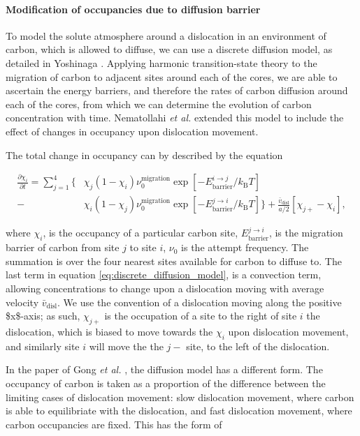 \documentclass[a4paper,11pt]{article}
\numberwithin{equation}{chapter}
\numberwithin{listing}{chapter}
\begin{document}
\paragraph{Modification of occupancies due to diffusion barrier}
\label{sec:org74cd325}


To model the solute atmosphere around a dislocation in an environment of
carbon, which is allowed to diffuse, we can use a discrete diffusion model,
as detailed in Yoshinaga \cite{Yoshinaga1971}. Applying harmonic
transition-state theory to the migration of carbon to adjacent sites around each of the cores,
we are able to ascertain the energy barriers, and therefore the rates of
carbon diffusion around each of the cores, from which we can determine the
evolution of carbon concentration with time. Nematollahi \emph{et al.} \cite{Nematollahi2016} extended this model
to include the effect of changes in occupancy upon dislocation movement.

The total change in occupancy can by described by
the equation

\begin{align*}
  \frac{\partial \chi_i}{\partial t} = \sum_{j=1}^4
 \Big\{ &\chi_j (1 - \chi_i) \nu_0^{\text{migration}} \exp{\left[ -
E_{\text{barrier}}^{i\rightarrow j} / k_{\text{B}} T\right]}\\ -
       &\chi_i (1 - \chi_j) \nu_0^{\text{migration}} \exp{\left[ -
E_{\text{barrier}}^{j\rightarrow i} / k_{\text{B}} T\right]}
\Big\} + \frac{\bar{v}_{\text{disl}}}{a/2} [\chi_{j+} - \chi_{i}],\label{eq:discrete_diffusion_model}
\end{align*}

where \(\chi_i\), is the occupancy of a particular carbon site,
\(E_{\text{barrier}}^{j\rightarrow i}\), is the migration barrier of carbon
from site \(j\) to site \(i\), \(\nu_0\) is the attempt frequency. The summation
is over the four nearest sites available for carbon to diffuse to. The last term
in equation \eqref{eq:discrete_diffusion_model}, is a convection term,
allowing concentrations to change upon a dislocation moving with average velocity
\(\bar{v}_{\text{disl}}\). We use the convention of a dislocation moving along
the positive \$x\$-axis; as such, \(\chi_{j+}\)
is the occupation of a site to the right of site \(i\) the dislocation, which is biased
to move towards the \(\chi_i\) upon dislocation movement, and similarly site
\(i\) will move the the \(j-\) site, to the left of the dislocation.


In the paper of Gong \emph{et al.} \cite{Gong2020}, the diffusion model has a
different form. The occupancy of carbon is
taken as a proportion of the difference between the limiting cases of
dislocation movement: slow dislocation movement, where carbon is able to
equilibriate with the dislocation, and fast dislocation movement, where
carbon occupancies are fixed. This has the form of
\end{document}
